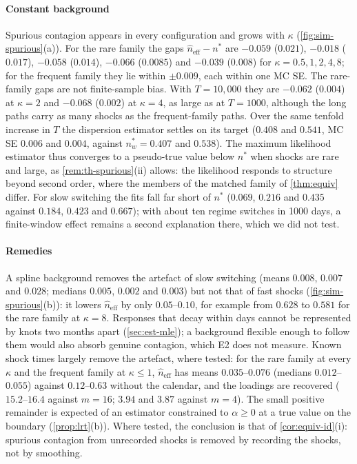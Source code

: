 \paragraph{Constant background} Spurious contagion appears in every configuration and grows
with $\kappa$ (\cref{fig:sim-spurious}(a)). For the rare family the gaps
$\hat n_{\mathrm{eff}}-n^*$ are $-0.059$ ($0.021$), $-0.018$ ($0.017$), $-0.058$ ($0.014$),
$-0.066$ ($0.0085$) and $-0.039$ ($0.008$) for $\kappa=0.5,1,2,4,8$; for the frequent family
they lie within $\pm0.009$, each within one MC SE. The rare-family gaps are not
finite-sample bias. With $T=10{,}000$ they are $-0.062$ ($0.004$) at $\kappa=2$ and $-0.068$
($0.002$) at $\kappa=4$, as large as at $T=1000$, although the long paths carry as many
shocks as the frequent-family paths. Over the same tenfold increase in $T$ the dispersion
estimator settles on its target ($0.408$ and $0.541$, MC SE $0.006$ and $0.004$, against
$n^*_w=0.407$ and $0.538$). The maximum likelihood estimator thus converges to a pseudo-true
value below $n^*$ when shocks are rare and large, as \cref{rem:th-spurious}(ii) allows: the
likelihood responds to structure beyond second order, where the members of the matched
family of \cref{thm:equiv} differ. For slow switching the fits fall far short of $n^*$
($0.069$, $0.216$ and $0.435$ against $0.184$, $0.423$ and $0.667$); with about ten regime
switches in 1000 days, a finite-window effect remains a second explanation there, which we
did not test.

\paragraph{Remedies} A spline background removes the artefact of slow switching (means
$0.008$, $0.007$ and $0.028$; medians $0.005$, $0.002$ and $0.003$) but not that of fast
shocks (\cref{fig:sim-spurious}(b)): it lowers $\hat n_{\mathrm{eff}}$ by only
$0.05$--$0.10$, for example from $0.628$ to $0.581$ for the rare family at $\kappa=8$.
Responses that decay within days cannot be represented by knots two months apart
(\cref{sec:est-mle}); a background flexible enough to follow them would also absorb genuine
contagion, which E2 does not measure. Known shock times largely remove the artefact, where
tested: for the rare family at every $\kappa$ and the frequent family at $\kappa\le1$,
$\hat n_{\mathrm{eff}}$ has means $0.035$--$0.076$ (medians $0.012$--$0.055$) against
$0.12$--$0.63$ without the calendar, and the loadings are recovered ($15.2$--$16.4$ against
$m=16$; $3.94$ and $3.87$ against $m=4$). The small positive remainder is expected of an
estimator constrained to $\alpha\ge0$ at a true value on the boundary (\cref{prop:lrt}(b)).
Where tested, the conclusion is that of \cref{cor:equiv-id}(i): spurious contagion from
unrecorded shocks is removed by recording the shocks, not by smoothing.

